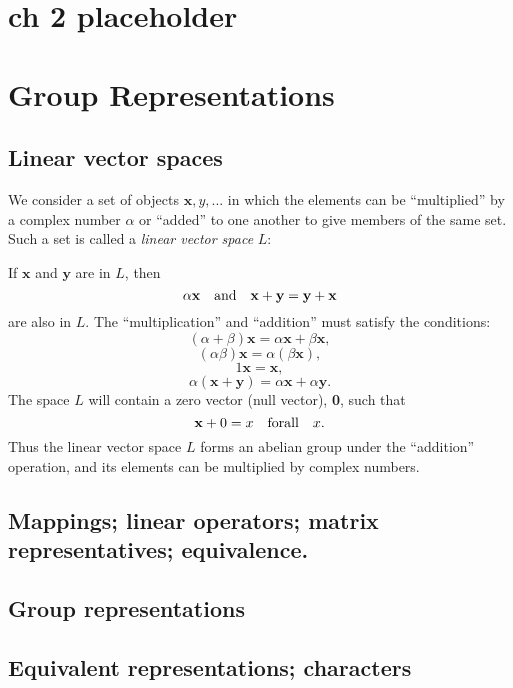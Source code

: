 \documentclass{book}
\begin{document}
\chapter{ch 2 placeholder}

\chapter{Group Representations}

\section{Linear vector spaces}

\def\bx{\mathbf x}
\def\by{\mathbf y}

We consider a set of objects ${\mathbf x,y,...}$ in which the elements
can be ``multiplied'' by a complex number $\alpha$ or ``added'' to one
another to give members of the same set. Such a set is called a {\it
  linear vector space} $L$:

If $\bx$ and $\by$ are in $L$, then
$$
\alpha{\mathbf x} \quad {\rm and} \quad {\bx+\by = \by+\bx}
$$ are also in $L$. The ``multiplication'' and ``addition'' must
satisfy the conditions:
$$(\alpha + \beta)\bx = \alpha\bx + \beta\bx,$$
$$(\alpha\beta)\bx = \alpha(\beta\bx),$$
$$1\bx = \bx,$$
$$\alpha(\bx+\by) = \alpha\bx + \alpha\by.$$
The space $L$ will contain a zero vector (null vector), {\bf 0}, such that
$$\mathbf x + 0 = x \quad {\rm for all} \quad x.$$
Thus the linear vector space $L$ forms an abelian group under the
``addition'' operation, and its elements can be multiplied by complex numbers.

\section{}
\section{}
\section{Mappings; linear operators; matrix representatives; \break equi\-valence.}
\section{Group representations}
\section{Equivalent representations; characters}
\end{document}
